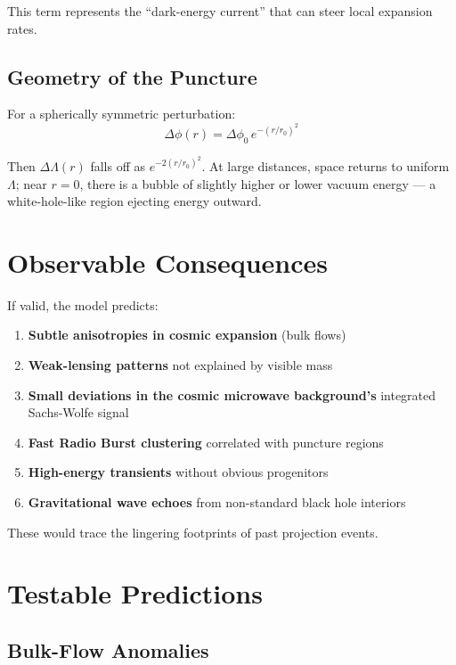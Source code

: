 \documentclass[11pt,a4paper]{article}
\begin{document}
This term represents the ``dark-energy current'' that can steer local expansion rates.

\subsection{Geometry of the Puncture}

For a spherically symmetric perturbation:
\begin{equation}
\Delta\phi(r) = \Delta\phi_0\,e^{-(r/r_0)^2}
\end{equation}

Then $\Delta\Lambda(r)$ falls off as $e^{-2(r/r_0)^2}$. At large distances, space returns to uniform $\Lambda$; near $r = 0$, there is a bubble of slightly higher or lower vacuum energy --- a white-hole-like region ejecting energy outward.

\section{Observable Consequences}

If valid, the model predicts:

\begin{enumerate}
\item \textbf{Subtle anisotropies in cosmic expansion} (bulk flows)
\item \textbf{Weak-lensing patterns} not explained by visible mass
\item \textbf{Small deviations in the cosmic microwave background's} integrated Sachs-Wolfe signal
\item \textbf{Fast Radio Burst clustering} correlated with puncture regions
\item \textbf{High-energy transients} without obvious progenitors
\item \textbf{Gravitational wave echoes} from non-standard black hole interiors
\end{enumerate}

These would trace the lingering footprints of past projection events.

\section{Testable Predictions}

\subsection{Bulk-Flow Anomalies}
\end{document}
